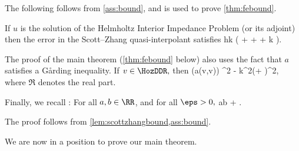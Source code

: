 The following  follows from \cref{ass:bound}, and is used to prove \cref{thm:febound}.

\bco\label{cor:hhszbound}
If $u$ is the solution of the Helmholtz Interior Impedance Problem (or its adjoint) then the error in the Scott--Zhang quasi-interpolant satisfies
\beq\label{eq:hhszbound}
 \lesssim \CHthh hk \mleft( +  + \NLtGD{\gradGD \gD} + k \NLtGD{\gD}\mright).
\eeq
\eco

The proof of the main theorem (\cref{thm:febound} below) also uses the fact that $a$ satisfies a G\r{a}rding inequality.
If $v \in \HozDDR,$ then
\beq\label{eq:garding}
\Re\mleft(a(v,v)\mright) \geq \Amin {}^2 - k^2\mleft(\Amin + \mright)^2,
\eeq
where $\Re$ denotes the real part.
\ele

Finally, we recall : For all $a,b \in \RR$, and for all $\eps > 0,$
\beq\label{eq:cauchy}
ab \leq {} + .
\eeq

The proof follows from \cref{lem:scottzhangbound,ass:bound}.
\epf

We are now in a position to prove our main theorem.




